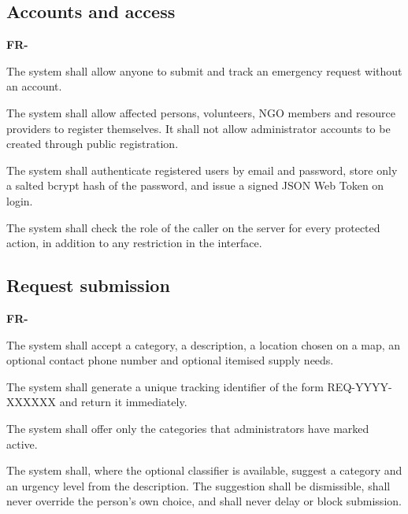 \documentclass{scrreprt}
\newcounter{fr}
\newcounter{frsave}
\newenvironment{frlist}
  {\begin{list}{\textbf{FR-\arabic{fr}}}{\usecounter{fr}\setcounter{fr}{\value{frsave}}%
   \setlength{\labelwidth}{1.5cm}\setlength{\leftmargin}{1.8cm}%
   \setlength{\itemsep}{3pt}\setlength{\parsep}{2pt}}}
  {\setcounter{frsave}{\value{fr}}\end{list}}
\begin{document}
\subsection*{Accounts and access}
\begin{frlist}
    \item The system shall allow anyone to submit and track an emergency request without an account.
    \item The system shall allow affected persons, volunteers, NGO members and resource providers to register themselves. It shall not allow administrator accounts to be created through public registration.
    \item The system shall authenticate registered users by email and password, store only a salted bcrypt hash of the password, and issue a signed JSON Web Token on login.
    \item The system shall check the role of the caller on the server for every protected action, in addition to any restriction in the interface.
\end{frlist}

\subsection*{Request submission}
\begin{frlist}
    \item The system shall accept a category, a description, a location chosen on a map, an optional contact phone number and optional itemised supply needs.
    \item The system shall generate a unique tracking identifier of the form REQ-YYYY-XXXXXX and return it immediately.
    \item The system shall offer only the categories that administrators have marked active.
    \item The system shall, where the optional classifier is available, suggest a category and an urgency level from the description. The suggestion shall be dismissible, shall never override the person's own choice, and shall never delay or block submission.
\end{frlist}
\end{document}
